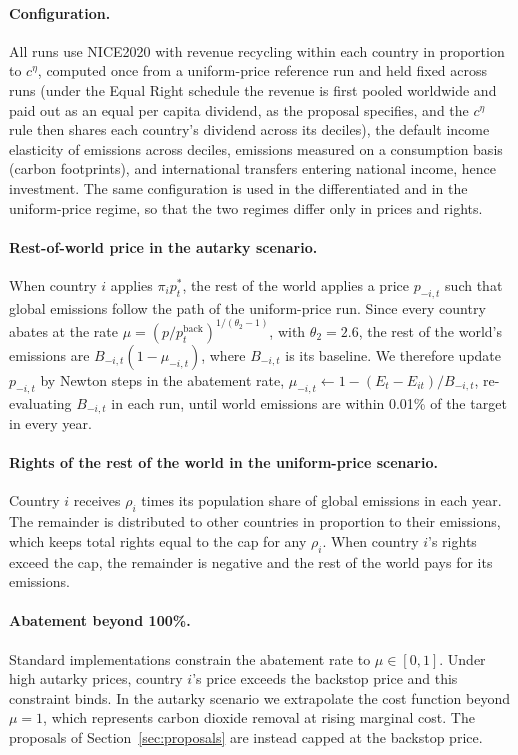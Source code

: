 \documentclass[12pt,english]{article}
\theoremstyle{remark}
\begin{document}
\paragraph{Configuration.} All runs use NICE2020 with revenue recycling within each country in proportion to $c^{\eta}$, computed once from a uniform-price reference run and held fixed across runs (under the Equal Right schedule the revenue is first pooled worldwide and paid out as an equal per capita dividend, as the proposal specifies, and the $c^{\eta}$ rule then shares each country's dividend across its deciles), the default income elasticity of emissions across deciles, emissions measured on a consumption basis (carbon footprints), and international transfers entering national income, hence investment. The same configuration is used in the differentiated and in the uniform-price regime, so that the two regimes differ only in prices and rights.

\paragraph{Rest-of-world price in the autarky scenario.} When country $i$ applies $\pi_i p^*_t$, the rest of the world applies a price $p_{-i,t}$ such that global emissions follow the path of the uniform-price run. Since every country abates at the rate $\mu=(p/p^{\mathrm{back}}_t)^{1/(\theta_2-1)}$, with $\theta_2=2.6$, the rest of the world's emissions are $B_{-i,t}(1-\mu_{-i,t})$, where $B_{-i,t}$ is its baseline. We therefore update $p_{-i,t}$ by Newton steps in the abatement rate, $\mu_{-i,t}\leftarrow 1-(E_t-E_{it})/B_{-i,t}$, re-evaluating $B_{-i,t}$ in each run, until world emissions are within 0.01\% of the target in every year.

\paragraph{Rights of the rest of the world in the uniform-price scenario.} Country $i$ receives $\rho_i$ times its population share of global emissions in each year. The remainder is distributed to other countries in proportion to their emissions, which keeps total rights equal to the cap for any $\rho_i$. When country $i$'s rights exceed the cap, the remainder is negative and the rest of the world pays for its emissions.

\paragraph{Abatement beyond 100\%.} Standard implementations constrain the abatement rate to $\mu\in[0,1]$. Under high autarky prices, country $i$'s price exceeds the backstop price and this constraint binds. In the autarky scenario we extrapolate the cost function beyond $\mu=1$, which represents carbon dioxide removal at rising marginal cost. The proposals of Section~\ref{sec:proposals} are instead capped at the backstop price.
\end{document}
